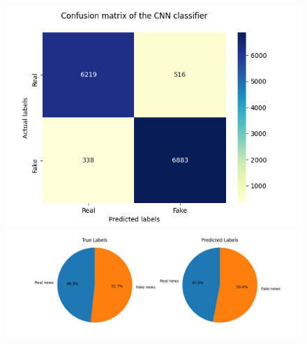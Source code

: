\documentclass[10pt,twocolumn,letterpaper]{article}
\begin{document}
\begin{figure}[h]
   \begin{center}
       \includegraphics[scale=0.8]{graphs/CNN/confusion_matrix.png}
        \includegraphics[scale=0.6]{graphs/CNN/piechart.png}
   \end{center}
        \vspace*{5mm}
        \caption{\label{seventh_figure}}
\end{figure}
\end{document}
